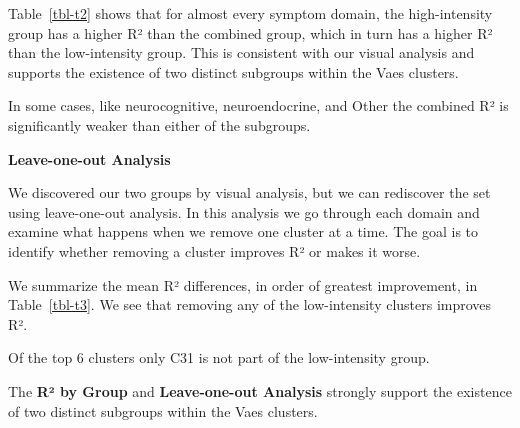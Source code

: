 \documentclass[
  letterpaper,
  DIV=11,
  numbers=noendperiod]{scrartcl}
\begin{document}
Table~\ref{tbl-t2} shows that for almost every symptom domain, the
high-intensity group has a higher R² than the combined group, which in
turn has a higher R² than the low-intensity group. This is consistent
with our visual analysis and supports the existence of two distinct
subgroups within the Vaes clusters.

In some cases, like neurocognitive, neuroendocrine, and Other the
combined R² is significantly weaker than either of the subgroups.

\FloatBarrier

\textbf{Leave-one-out Analysis}

We discovered our two groups by visual analysis, but we can rediscover
the set using leave-one-out analysis. In this analysis we go through
each domain and examine what happens when we remove one cluster at a
time. The goal is to identify whether removing a cluster improves R² or
makes it worse.

We summarize the mean R² differences, in order of greatest improvement,
in Table~\ref{tbl-t3}. We see that removing any of the low-intensity
clusters improves R².

\begin{table}

\caption{\label{tbl-t3}Leave-one-out Analysis}


\end{table}%

Of the top 6 clusters only C31 is not part of the low-intensity group.

The \textbf{R² by Group} and \textbf{Leave-one-out Analysis} strongly
support the existence of two distinct subgroups within the Vaes
clusters.
\end{document}
